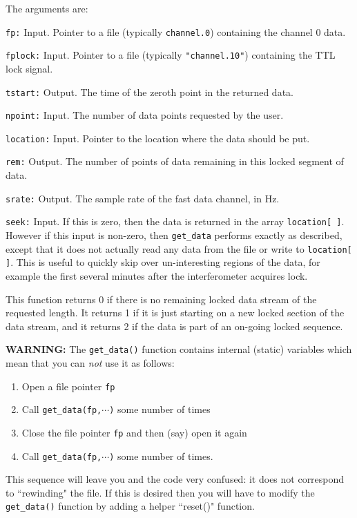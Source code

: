 The arguments are:
\begin{description}
\item{\tt fp:} Input. Pointer to a file (typically {\tt channel.0})
containing the channel 0 data.
\item{\tt fplock:} Input. Pointer to a file
(typically {\tt "channel.10"}) containing the TTL lock
signal.
\item{\tt tstart:} Output.  The time of the zeroth point in the
returned data.
\item{\tt npoint:} Input.  The number of data points requested by the
user.
\item{\tt location:} Input.  Pointer to the location where the data
should be put.
\item{\tt rem:} Output.  The number of points of data remaining in this
locked segment of data.
\item{\tt srate:} Output.  The sample rate of the fast data channel, in Hz.
\item{\tt seek:} Input.  If this is zero, then the data is returned in
the array {\tt location[ ]}.  However if this input is non-zero, then
{\tt get\_data} performs exactly as described, except that it does not
actually read any data from the file or write to {\tt location[ ]}.
This is useful to quickly skip over un-interesting regions of the data,
for example the first several minutes after the interferometer acquires
lock.
\end{description}

This function returns 0 if there is no remaining locked data stream of
the requested length.  It returns 1 if it is just starting on a new
locked section of the data stream, and it returns 2 if the data is part
of an on-going locked sequence.

{\bf WARNING: } The {\tt get\_data()} function contains internal (static)
variables which mean that you can {\it not} use it as follows:
\begin{enumerate}
\item
Open a file pointer {\tt fp}
\item
Call {\tt get\_data(fp,$\cdots$)} some number of times
\item
Close the file pointer {\tt fp} and then (say) open it again
\item
Call {\tt get\_data(fp,$\cdots$)} some number of times.
\end{enumerate}
This sequence will leave you and the code very confused: it does not
correspond to ``rewinding" the file.  If this is desired then you
will have to modify the {\tt get\_data()} function by adding a helper
``reset()" function.

